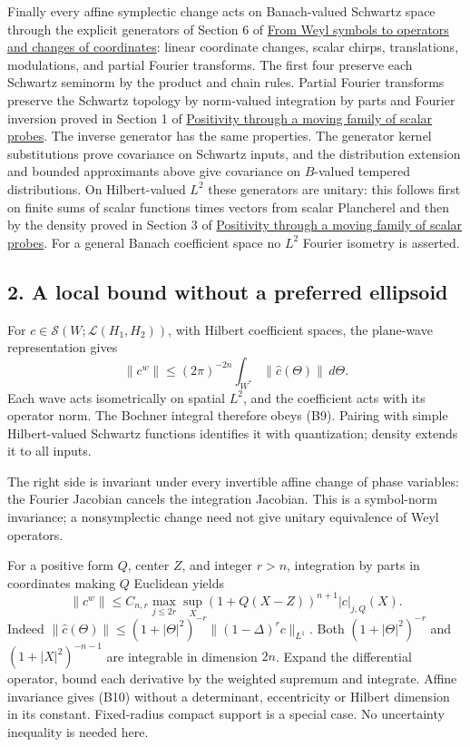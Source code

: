 \documentclass[
  11pt,
]{article}
\begin{document}
Finally every affine symplectic change acts on Banach-valued Schwartz
space through the explicit generators of Section 6 of
\href{weyl-covariance-action.pdf}{From Weyl symbols to operators and
changes of coordinates}: linear coordinate changes, scalar chirps,
translations, modulations, and partial Fourier transforms. The first
four preserve each Schwartz seminorm by the product and chain rules.
Partial Fourier transforms preserve the Schwartz topology by norm-valued
integration by parts and Fourier inversion proved in Section 1 of
\href{positive-quantization.pdf}{Positivity through a moving family of
scalar probes}. The inverse generator has the same properties. The
generator kernel substitutions prove covariance on Schwartz inputs, and
the distribution extension and bounded approximants above give
covariance on \(B\)-valued tempered distributions. On Hilbert-valued
\(L^2\) these generators are unitary: this follows first on finite sums
of scalar functions times vectors from scalar Plancherel and then by the
density proved in Section 3 of
\href{positive-quantization.pdf}{Positivity through a moving family of
scalar probes}. For a general Banach coefficient space no \(L^2\)
Fourier isometry is asserted.

\subsection{2. A local bound without a preferred
ellipsoid}\label{a-local-bound-without-a-preferred-ellipsoid}

For \(c\in\mathcal S(W;\mathcal L(H_1,H_2))\), with Hilbert coefficient
spaces, the plane-wave representation gives \[
 \|c^w\|\le (2\pi)^{-2n}\int_{W^*}\|\widehat c(\Theta)\|\,d\Theta.
 \tag{B9}
\] Each wave acts isometrically on spatial \(L^2\), and the coefficient
acts with its operator norm. The Bochner integral therefore obeys (B9).
Pairing with simple Hilbert-valued Schwartz functions identifies it with
quantization; density extends it to all inputs.

The right side is invariant under every invertible affine change of
phase variables: the Fourier Jacobian cancels the integration Jacobian.
This is a symbol-norm invariance; a nonsymplectic change need not give
unitary equivalence of Weyl operators.

For a positive form \(Q\), center \(Z\), and integer \(r>n\),
integration by parts in coordinates making \(Q\) Euclidean yields \[
 \|c^w\|\le C_{n,r}\max_{j\le2r}\sup_X
 (1+Q(X-Z))^{n+1}|c|_{j,Q}(X).
 \tag{B10}
\] Indeed
\(\|\widehat c(\Theta)\|\le(1+|\Theta|^2)^{-r}\|(1-\Delta)^r c\|_{L^1}\).
Both \((1+|\Theta|^2)^{-r}\) and \((1+|X|^2)^{-n-1}\) are integrable in
dimension \(2n\). Expand the differential operator, bound each
derivative by the weighted supremum and integrate. Affine invariance
gives (B10) without a determinant, eccentricity or Hilbert dimension in
its constant. Fixed-radius compact support is a special case. No
uncertainty inequality is needed here.
\end{document}
